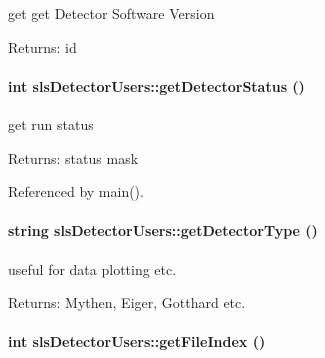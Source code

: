 get get Detector Software Version \begin{Desc}
\item[Returns:]id \end{Desc}
\hypertarget{classslsDetectorUsers_c7d0254e38b8fe783204f691a4ee05b2}{
\paragraph[getDetectorStatus]{\setlength{\rightskip}{0pt plus 5cm}int sls\-Detector\-Users::get\-Detector\-Status ()}\hfill}
\label{classslsDetectorUsers_c7d0254e38b8fe783204f691a4ee05b2}


get run status 

\begin{Desc}
\item[Returns:]status mask \end{Desc}


Referenced by main().\hypertarget{classslsDetectorUsers_5292a3d9c12696512b81bcc6c579a03c}{
\paragraph[getDetectorType]{\setlength{\rightskip}{0pt plus 5cm}string sls\-Detector\-Users::get\-Detector\-Type ()}\hfill}
\label{classslsDetectorUsers_5292a3d9c12696512b81bcc6c579a03c}


useful for data plotting etc. 

\begin{Desc}
\item[Returns:]Mythen, Eiger, Gotthard etc. \end{Desc}
\hypertarget{classslsDetectorUsers_6e3467bf3c0c246f69f85d485d84dd62}{
\paragraph[getFileIndex]{\setlength{\rightskip}{0pt plus 5cm}int sls\-Detector\-Users::get\-File\-Index ()}\hfill}
\label{classslsDetectorUsers_6e3467bf3c0c246f69f85d485d84dd62}


